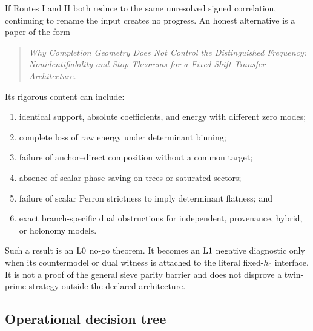 If Routes I and II both reduce to the same unresolved signed
correlation, continuing to rename the input creates no progress.
An honest alternative is a paper of the form
\begin{quote}
\emph{Why Completion Geometry Does Not Control the Distinguished
Frequency: Nonidentifiability and Stop Theorems for a Fixed-Shift
Transfer Architecture.}
\end{quote}
Its rigorous content can include:
\begin{enumerate}[label=(N\arabic*),leftmargin=2.7em]
\item identical support, absolute coefficients, and energy with
different zero modes;
\item complete loss of raw energy under determinant binning;
\item failure of anchor--direct composition without a common target;
\item absence of scalar phase saving on trees or saturated sectors;
\item failure of scalar Perron strictness to imply determinant
flatness; and
\item exact branch-specific dual obstructions for independent,
provenance, hybrid, or holonomy models.
\end{enumerate}
Such a result is an \(\mathrm{L0}\) no-go theorem.  It becomes an
\(\mathrm{L1}\) negative diagnostic only when its countermodel or dual
witness is attached to the literal fixed-\(h_0\) interface.  It is
not a proof of the general sieve parity barrier and does not disprove
a twin-prime strategy outside the declared architecture.

\subsection{Operational decision tree}

